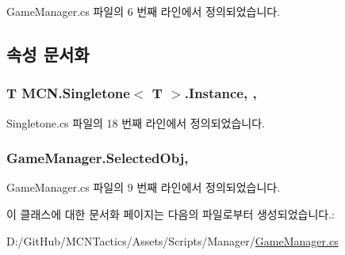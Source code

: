 Game\+Manager.\+cs 파일의 6 번째 라인에서 정의되었습니다.



\subsection{속성 문서화}
\subsubsection[{\texorpdfstring{Instance}{Instance}}]{\setlength{\rightskip}{0pt plus 5cm}T {\bf M\+C\+N.\+Singletone}$<$ T $>$.Instance\hspace{0.3cm}{\ttfamily [static]}, {\ttfamily [get]}, {\ttfamily [inherited]}}\hypertarget{class_m_c_n_1_1_singletone_a46dbbebd93e96a9592a9803c51f35602}{}\label{class_m_c_n_1_1_singletone_a46dbbebd93e96a9592a9803c51f35602}


Singletone.\+cs 파일의 18 번째 라인에서 정의되었습니다.

\subsubsection[{\texorpdfstring{Selected\+Obj}{SelectedObj}}]{ Game\+Manager.\+Selected\+Obj\hspace{0.3cm}{\ttfamily [get]}, {\ttfamily [set]}}\hypertarget{class_game_manager_afe043cc0216cce9ef00ddff0413e6edf}{}\label{class_game_manager_afe043cc0216cce9ef00ddff0413e6edf}


Game\+Manager.\+cs 파일의 9 번째 라인에서 정의되었습니다.



이 클래스에 대한 문서화 페이지는 다음의 파일로부터 생성되었습니다.\+:\begin{DoxyCompactItemize}
\item 
D\+:/\+Git\+Hub/\+M\+C\+N\+Tactics/\+Assets/\+Scripts/\+Manager/\hyperlink{_game_manager_8cs}{Game\+Manager.\+cs}\end{DoxyCompactItemize}
